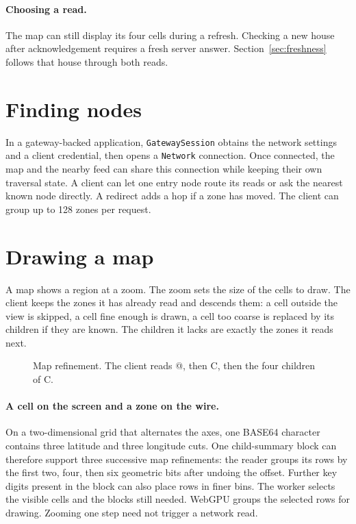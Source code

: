 \documentclass[11pt]{article}
\begin{document}
\paragraph{Choosing a read.}
The map can still display its four cells during a refresh. Checking a new house after acknowledgement requires a fresh server answer. Section~\ref{sec:freshness} follows that house through both reads.

\section{Finding nodes}
In a gateway-backed application, \texttt{GatewaySession} obtains the network settings and a client credential, then opens a \texttt{Network} connection. Once connected, the map and the nearby feed can share this connection while keeping their own traversal state. A client can let one entry node route its reads or ask the nearest known node directly. A redirect adds a hop if a zone has moved. The client can group up to 128 zones per request.

\section{Drawing a map}\hypertarget{ix:map}{}
A map shows a region at a zoom. The zoom sets the size of the cells to draw. The client keeps the zones it has already read and descends them: a cell outside the view is skipped, a cell fine enough is drawn, a cell too coarse is replaced by its children if they are known. The children it lacks are exactly the zones it reads next.

\begin{figure}[H]
    \centering
    \caption{Map refinement. The client reads @, then C, then the four children of C.}
\end{figure}

\paragraph{A cell on the screen and a zone on the wire.}
On a two-dimensional grid that alternates the axes, one BASE64 character contains three latitude and three longitude cuts. One child-summary block can therefore support three successive map refinements: the reader groups its rows by the first two, four, then six geometric bits after undoing the offset. Further key digits present in the block can also place rows in finer bins. The worker selects the visible cells and the blocks still needed. WebGPU groups the selected rows for drawing. Zooming one step need not trigger a network read.
\end{document}
